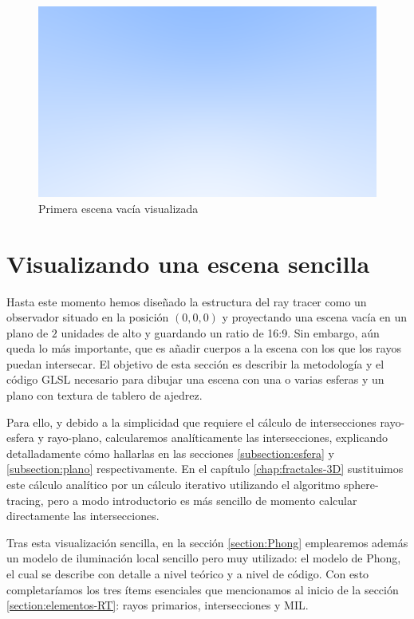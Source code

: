 \begin{figure} [ht]
    \centering
    \includegraphics[scale = 0.35]{img/C7/first-render.png}
    \caption{Primera escena vacía visualizada}
    \label{fig:first-render}
\end{figure}

\section{Visualizando una escena sencilla}
\label{section:escena}

Hasta este momento hemos diseñado la estructura del ray tracer como un observador situado en la posición $(0, 0,0)$ y proyectando una escena vacía en un plano de $2$ unidades de alto y guardando un ratio de 16:9. Sin embargo, aún queda lo más importante, que es añadir cuerpos a la escena con los que los rayos puedan intersecar. El objetivo de esta sección es describir la metodología y el código GLSL necesario para dibujar una escena con una o varias esferas y un plano con textura de tablero de ajedrez. 

Para ello, y debido a la simplicidad que requiere el cálculo de intersecciones rayo-esfera y rayo-plano, calcularemos analíticamente las intersecciones, explicando detalladamente cómo hallarlas en las secciones \ref{subsection:esfera} y \ref{subsection:plano} respectivamente. En el capítulo \ref{chap:fractales-3D} sustituimos este cálculo analítico por un cálculo iterativo utilizando el algoritmo sphere-tracing, pero a modo introductorio es más sencillo de momento calcular directamente las intersecciones.

Tras esta visualización sencilla, en la sección \ref{section:Phong} emplearemos además un modelo de iluminación local sencillo pero muy utilizado: el modelo de Phong, el cual se describe con detalle a nivel teórico y a nivel de código. Con esto completaríamos los tres ítems esenciales que mencionamos al inicio de la sección \ref{section:elementos-RT}: rayos primarios, intersecciones y MIL.

